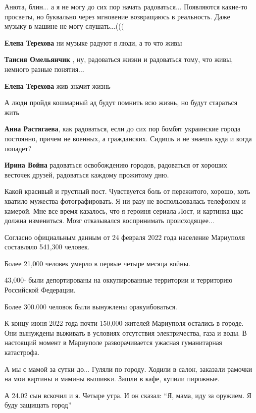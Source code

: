 \begin{itemize} %

Анюта, блин... а я не могу до сих пор начать радоваться... Появляются какие-то
просветы, но буквально через мгновение возвращаюсь в реальность. Даже музыку в
машине не могу слушать...(((

\textbf{Елена Терехова} ни музыке радуют я люди, а то что живы

\textbf{Таисия Омельянчик} , ну, радоваться жизни и радоваться тому, что живы, немного разные понятия...

\textbf{Елена Терехова} жив значит жизнь


А люди пройдя кошмарный ад будут помнить всю жизнь, но будут стараться жить

\textbf{Анна Растягаева}, как радоваться, если до сих пор бомбят украинские города постоянно, причем не военных, а гражданских. Сидишь и не знаешь куда и когда попадет?

\textbf{Ирина Война} радоваться освобождению городов, радоваться от хороших весточек друзей, радоваться каждому прожитому дню.
\end{itemize} %


Какой красивый и грустный пост. Чувствуется боль от пережитого, хорошо, хоть
хватило мужества фотографировать. Я ни разу не воспользовалась телефоном и
камерой. Мне все время казалось, что я героиня сериала Лост, и картинка щас
должна измениться. Мозг отказывался воспринимать происходящее...


Согласно официальным данным от 24 февраля 2022 года население Мариуполя
составляло 541,300 человек.

Более 21,000 человек умерло в первые четыре месяца войны.

43,000- были депортированы на оккупированные территории и территорию Российской
Федерации.

Более 300.000 человок были вынужлены оракуибоваться.

К концу июня 2022 года почти 150,000 жителей Мариуполя остались в городе. Они
вынуждены выживать в условиях отсутствия электричества, газа и воды. В
настоящий момент в Мариуполе разворачивается ужасная гуманитарная катастрофа.


А мы с мамой за сутки до... Гуляли по городу. Ходили в салон, заказали рамочки
на мои картины и мамины вышивки. Зашли в кафе, купили пирожные.

А 24.02 сын вскочил и я. Четыре утра. И он сказал: \enquote{Я, мама, иду за
оружием. Я буду защищать город}
